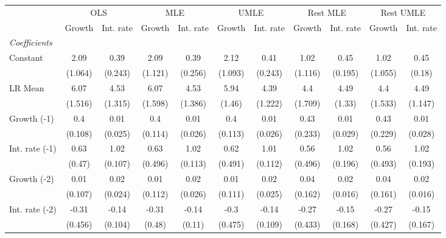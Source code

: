 \begin{table}[htbp] 
	\centering
	\begin{tabular}{@{\extracolsep{4pt}}lcccccccccc@{}}		\hline\hline
		 		 & \multicolumn{2}{c}{OLS} &\multicolumn{2}{c}{MLE} &\multicolumn{2}{c}{UMLE} &\multicolumn{2}{c}{Rest MLE} &\multicolumn{2}{c}{Rest UMLE} \\ 
 		 & Growth 	 & Int. rate 	 & Growth 	 & Int. rate 	 & Growth 	 & Int. rate 	 & Growth 	 & Int. rate 	 & Growth 	 & Int. rate\\\cline{2-3}\cline{4-5}\cline{6-7}\cline{8-9}\cline{10-11}
\rule{0pt}{4ex} 
 \emph{Coefficients} 	  		 & 		 & 		 & 		 & 		 & 		 & 		 & 		 & 		 & 		 &\\ 
\quad Constant 	 & 2.09 	 & 0.39 	 & 2.09 	 & 0.39 	 & 2.12 	 & 0.41 	 & 1.02 	 & 0.45 	 & 1.02 	 & 0.45	 \\ 
 		 & (1.064) 	 & (0.243) 	 & (1.121) 	 & (0.256) 	 & (1.093) 	 & (0.243) 	 & (1.116) 	 & (0.195) 	 & (1.055) 	 & (0.18) 	 \\ 
\quad LR Mean 	 & 6.07 	 & 4.53 	 & 6.07 	 & 4.53 	 & 5.94 	 & 4.39 	 & 4.4 	 & 4.49 	 & 4.4 	 & 4.49	 \\ 
 		 & (1.516) 	 & (1.315) 	 & (1.598) 	 & (1.386) 	 & (1.46) 	 & (1.222) 	 & (1.709) 	 & (1.33) 	 & (1.533) 	 & (1.147) 	 \\ 
\quad Growth (-1) 	 &0.4 	 & 0.01 	 & 0.4 	 & 0.01 	 & 0.4 	 & 0.01 	 & 0.43 	 & 0.01 	 & 0.43 	 & 0.01	 \\ 
 		 & (0.108) 	 & (0.025) 	 & (0.114) 	 & (0.026) 	 & (0.113) 	 & (0.026) 	 & (0.233) 	 & (0.029) 	 & (0.229) 	 & (0.028) 	 \\ 
\quad Int. rate (-1) 	 &0.63 	 & 1.02 	 & 0.63 	 & 1.02 	 & 0.62 	 & 1.01 	 & 0.56 	 & 1.02 	 & 0.56 	 & 1.02	 \\ 
 		 & (0.47) 	 & (0.107) 	 & (0.496) 	 & (0.113) 	 & (0.491) 	 & (0.112) 	 & (0.496) 	 & (0.196) 	 & (0.493) 	 & (0.193) 	 \\ 
\quad Growth (-2) 	 &0.01 	 & 0.02 	 & 0.01 	 & 0.02 	 & 0.01 	 & 0.02 	 & 0.04 	 & 0.02 	 & 0.04 	 & 0.02	 \\ 
 		 & (0.107) 	 & (0.024) 	 & (0.112) 	 & (0.026) 	 & (0.111) 	 & (0.025) 	 & (0.162) 	 & (0.016) 	 & (0.161) 	 & (0.016) 	 \\ 
\quad Int. rate (-2) 	 &-0.31 	 & -0.14 	 & -0.31 	 & -0.14 	 & -0.3 	 & -0.14 	 & -0.27 	 & -0.15 	 & -0.27 	 & -0.15	 \\ 
 		 & (0.456) 	 & (0.104) 	 & (0.48) 	 & (0.11) 	 & (0.475) 	 & (0.109) 	 & (0.433) 	 & (0.168) 	 & (0.427) 	 & (0.167) 	 \\ 

\end{tabular}
\end{table}
